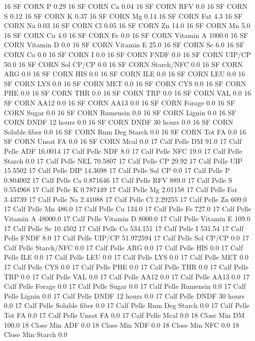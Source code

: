 \documentclass[letterpaper,10pt,english]{sphinxmanual}
\begin{document}
\begin{sphinxVerbatim}[commandchars=\\\{\},numbers=left,firstnumber=1,stepnumber=1]
16 SF CORN P 0.29
16 SF CORN Ca 0.04
16 SF CORN RFV 0.0
16 SF CORN S 0.12
16 SF CORN K 0.37
16 SF CORN Mg 0.14
16 SF CORN Fat 4.3
16 SF CORN Na 0.03
16 SF CORN Cl 0.05
16 SF CORN Zn 14.0
16 SF CORN Mn 5.0
16 SF CORN Cu 4.0
16 SF CORN Fe 0.0
16 SF CORN Vitamin A 1000.0
16 SF CORN Vitamin D 0.0
16 SF CORN Vitamin E 25.0
16 SF CORN Se 6.0
16 SF CORN Co 0.0
16 SF CORN I 0.0
16 SF CORN FNDF 0.0
16 SF CORN UIP/CP 50.0
16 SF CORN Sol CP/CP 0.0
16 SF CORN Starch/NFC 0.0
16 SF CORN ARG 0.0
16 SF CORN HIS 0.0
16 SF CORN ILE 0.0
16 SF CORN LEU 0.0
16 SF CORN LYS 0.0
16 SF CORN MET 0.0
16 SF CORN CYS 0.0
16 SF CORN PHE 0.0
16 SF CORN THR 0.0
16 SF CORN TRP 0.0
16 SF CORN VAL 0.0
16 SF CORN AA\PYGZsh{}12 0.0
16 SF CORN AA\PYGZsh{}13 0.0
16 SF CORN \PYGZpc{} Forage 0.0
16 SF CORN Sugar \PYGZpc{} 0.0
16 SF CORN Rumensin 0.0
16 SF CORN Lignin 0.0
16 SF CORN DNDF 12 hours 0.0
16 SF CORN DNDF 30 hours 0.0
16 SF CORN Soluble fiber 0.0
16 SF CORN Rum Deg Starch 0.0
16 SF CORN Tot FA 0.0
16 SF CORN Unsat FA 0.0
16 SF CORN Mcal 0.0
17 Calf Pelle DM 91.0
17 Calf Pelle ADF 16.0014
17 Calf Pelle NDF 8.0
17 Calf Pelle NFC 19.0
17 Calf Pelle Starch 0.0
17 Calf Pelle NEL 70.5807
17 Calf Pelle CP 29.92
17 Calf Pelle UIP 15.5502
17 Calf Pelle DIP 14.3698
17 Calf Pelle Sol CP 0.0
17 Calf Pelle P 0.804002
17 Calf Pelle Ca 0.871646
17 Calf Pelle RFV 889.0
17 Calf Pelle S 0.554968
17 Calf Pelle K 0.787449
17 Calf Pelle Mg 2.01158
17 Calf Pelle Fat 3.43739
17 Calf Pelle Na 2.41088
17 Calf Pelle Cl 2.29255
17 Calf Pelle Zn 609.0
17 Calf Pelle Mn 486.0
17 Calf Pelle Cu 134.0
17 Calf Pelle Fe 727.0
17 Calf Pelle Vitamin A 48000.0
17 Calf Pelle Vitamin D 8000.0
17 Calf Pelle Vitamin E 109.0
17 Calf Pelle Se 10.4502
17 Calf Pelle Co 534.151
17 Calf Pelle I 531.54
17 Calf Pelle FNDF 8.0
17 Calf Pelle UIP/CP 51.972594
17 Calf Pelle Sol CP/CP 0.0
17 Calf Pelle Starch/NFC 0.0
17 Calf Pelle ARG 0.0
17 Calf Pelle HIS 0.0
17 Calf Pelle ILE 0.0
17 Calf Pelle LEU 0.0
17 Calf Pelle LYS 0.0
17 Calf Pelle MET 0.0
17 Calf Pelle CYS 0.0
17 Calf Pelle PHE 0.0
17 Calf Pelle THR 0.0
17 Calf Pelle TRP 0.0
17 Calf Pelle VAL 0.0
17 Calf Pelle AA\PYGZsh{}12 0.0
17 Calf Pelle AA\PYGZsh{}13 0.0
17 Calf Pelle \PYGZpc{} Forage 0.0
17 Calf Pelle Sugar \PYGZpc{} 0.0
17 Calf Pelle Rumensin 0.0
17 Calf Pelle Lignin 0.0
17 Calf Pelle DNDF 12 hours 0.0
17 Calf Pelle DNDF 30 hours 0.0
17 Calf Pelle Soluble fiber 0.0
17 Calf Pelle Rum Deg Starch 0.0
17 Calf Pelle Tot FA 0.0
17 Calf Pelle Unsat FA 0.0
17 Calf Pelle Mcal 0.0
18 Close Min DM 100.0
18 Close Min ADF 0.0
18 Close Min NDF 0.0
18 Close Min NFC 0.0
18 Close Min Starch 0.0

\end{sphinxVerbatim}
\end{document}
